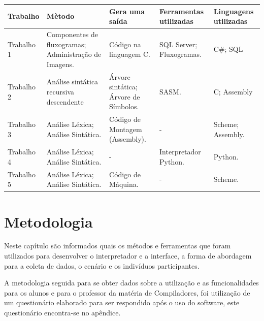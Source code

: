 \documentclass[12pt,oneside,a4paper,chapter=TITLE,section=TITLE,sumario=tradicional]{abntex2}
\begin{document}
\begin{quadro}[htb]
    \centering
    \vspace{0.5cm}
    \begin{tabular}{|p{3.0cm}|p{3.0cm}|p{3.0cm}|p{3.0cm}|p{3.0cm}|}
        \hline
        \textbf{Trabalho} & \textbf{Mètodo} & \textbf{Gera uma saída} & \textbf{Ferramentas utilizadas} & \textbf{Linguagens utilizadas} \\ 
        \hline\hline
        Trabalho 1 & Componentes de fluxogramas; Administração de Imagens. & Código na linguagem C.   &  SQL Server; Fluxogramas. & C\#; SQL    \\ \hline 
        Trabalho 2 & Análise sintática recursiva descendente    & Árvore sintática; Árvore de Símbolos.   & SASM.  & C; Assembly  \\ \hline
        Trabalho 3 & Análise Léxica;  Análise Sintática.   & Código de Montagem (Assembly).  &  -  & Scheme; Assembly.  \\ \hline
        Trabalho 4 & Análise Léxica;  Análise Sintática.   & -   &  Interpretador Python.  & Python.   \\ \hline
        Trabalho 5 & Análise Léxica;  Análise Sintática.   &  Código de Máquina.   & -   & Scheme.   \\ \hline
    \end{tabular}

    
\end{quadro}



\chapter{Metodologia}
\label{cap:metodologia}

Neste capítulo são informados quais os métodos e ferramentas que foram utilizados para desenvolver o interpretador e a interface, a forma de abordagem para a coleta de dados, o cenário e os indivíduos participantes.

A metodologia seguida para se obter dados sobre a utilização e as funcionalidades para os alunos e para o professor da matéria de Compiladores, foi utilização de um questionário elaborado para ser respondido após o uso do software, este questionário encontra-se no apêndice.
\end{document}
